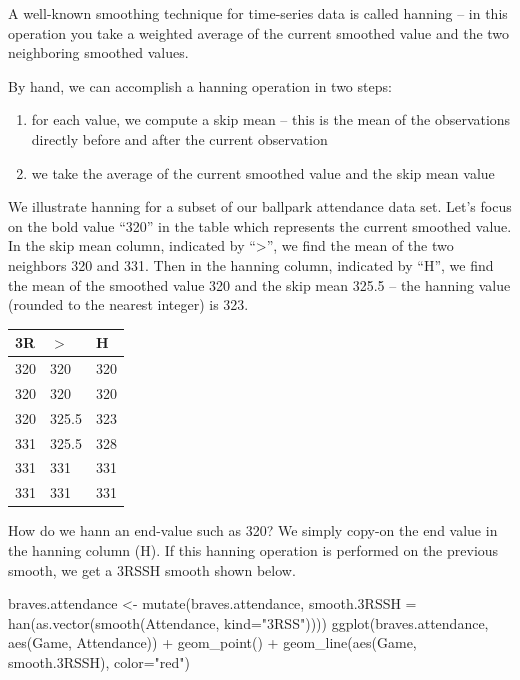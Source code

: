 \documentclass[
]{book}
\newenvironment{Shaded}{\begin{snugshade}}{\end{snugshade}}
\newcommand{\AttributeTok}[1]{\textcolor[rgb]{0.77,0.63,0.00}{#1}}
\newcommand{\FloatTok}[1]{\textcolor[rgb]{0.00,0.00,0.81}{#1}}
\newcommand{\FunctionTok}[1]{\textcolor[rgb]{0.00,0.00,0.00}{#1}}
\newcommand{\NormalTok}[1]{#1}
\newcommand{\OtherTok}[1]{\textcolor[rgb]{0.56,0.35,0.01}{#1}}
\newcommand{\SpecialCharTok}[1]{\textcolor[rgb]{0.00,0.00,0.00}{#1}}
\newcommand{\StringTok}[1]{\textcolor[rgb]{0.31,0.60,0.02}{#1}}
\providecommand{\tightlist}{%
  \setlength{\itemsep}{0pt}\setlength{\parskip}{0pt}}
\begin{document}
A well-known smoothing technique for time-series data is called hanning -- in this operation you take a weighted average of the current smoothed value and the two neighboring smoothed values.

By hand, we can accomplish a hanning operation in two steps:

\begin{enumerate}
\def\labelenumi{\arabic{enumi}.}
\tightlist
\item
  for each value, we compute a skip mean -- this is the mean of the observations directly before and after the current observation
\item
  we take the average of the current smoothed value and the skip mean value
\end{enumerate}

We illustrate hanning for a subset of our ballpark attendance data set. Let's focus on the bold value ``320'' in the table which represents the current smoothed value. In the skip mean column, indicated by ``\textgreater{}'', we find the mean of the two neighbors 320 and 331. Then in the hanning column, indicated by ``H'', we find the mean of the smoothed value 320 and the skip mean 325.5 -- the hanning value (rounded to the nearest integer) is 323.

\begin{longtable}[]{@{}lll@{}}
\toprule
3R & \(>\) & H \\
\midrule
\endhead
320 & 320 & 320 \\
320 & 320 & 320 \\
320 & 325.5 & 323 \\
331 & 325.5 & 328 \\
331 & 331 & 331 \\
331 & 331 & 331 \\
\bottomrule
\end{longtable}

How do we hann an end-value such as 320? We simply copy-on the end value in the hanning column (H). If this hanning operation is performed on the previous smooth, we get a 3RSSH smooth shown below.

\begin{Shaded}
\begin{Highlighting}[]
\NormalTok{braves.attendance }\OtherTok{\textless{}{-}} \FunctionTok{mutate}\NormalTok{(braves.attendance,}
      \AttributeTok{smooth.3RSSH =} \FunctionTok{han}\NormalTok{(}\FunctionTok{as.vector}\NormalTok{(}\FunctionTok{smooth}\NormalTok{(Attendance,}
                            \AttributeTok{kind=}\StringTok{"3RSS"}\NormalTok{))))}
\FunctionTok{ggplot}\NormalTok{(braves.attendance,}
       \FunctionTok{aes}\NormalTok{(Game, Attendance)) }\SpecialCharTok{+}
  \FunctionTok{geom\_point}\NormalTok{() }\SpecialCharTok{+}
  \FunctionTok{geom\_line}\NormalTok{(}\FunctionTok{aes}\NormalTok{(Game, smooth}\FloatTok{.3}\NormalTok{RSSH), }\AttributeTok{color=}\StringTok{"red"}\NormalTok{) }
\end{Highlighting}
\end{Shaded}
\end{document}
